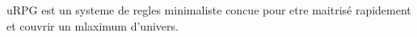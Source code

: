 
uRPG est un systeme de regles minimaliste concue pour etre maitris\'e rapidement et couvrir un mlaximum d'univers.


